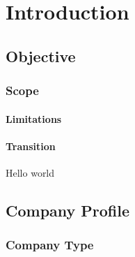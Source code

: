 \chapter{Introduction}

\lipsum[1]

\section{Objective}

\lipsum[2]

\subsection{Scope}

\lipsum[3]

\subsubsection{Limitations}

\lipsum[4]

\subsubsection{Transition}

Hello world

\lipsum[2]

\section{Company Profile}

\lipsum[4]

\subsection{Company Type}

\lipsum[4]